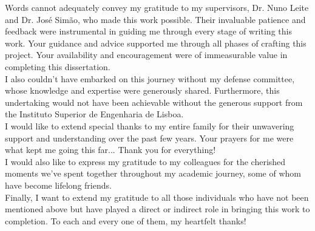 \acknowledgements


Words cannot adequately convey my gratitude to my supervisors, Dr. Nuno Leite and Dr. José Simão, who made this work possible. Their invaluable patience and feedback were instrumental in guiding me through every stage of writing this work. Your guidance and advice supported me through all phases of crafting this project. Your availability and encouragement were of immeasurable value in completing this dissertation.\\

I also couldn't have embarked on this journey without my defense committee, whose knowledge and expertise were generously shared. Furthermore, this undertaking would not have been achievable without the generous support from the Instituto Superior de Engenharia de Lisboa.\\

I would like to extend special thanks to my entire family for their unwavering support and understanding over the past few years. Your prayers for me were what kept me going this far... Thank you for everything!\\

I would also like to express my gratitude to my colleagues for the cherished moments we've spent together throughout my academic journey, some of whom have become lifelong friends.\\

Finally, I want to extend my gratitude to all those individuals who have not been mentioned above but have played a direct or indirect role in bringing this work to completion. To each and every one of them, my heartfelt thanks!